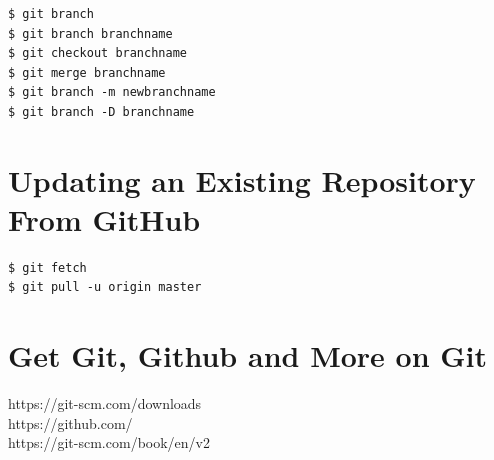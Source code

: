\begin{shaded}
\begin{verbatim}
$ git branch
$ git branch branchname
$ git checkout branchname
$ git merge branchname
$ git branch -m newbranchname
$ git branch -D branchname
\end{verbatim}
\end{shaded}

\vspace{1cm}

\section{Updating an Existing Repository From GitHub }

\begin{shaded}
\begin{verbatim}
$ git fetch
$ git pull -u origin master
\end{verbatim}
\end{shaded}

\vspace{1cm}

\section{Get Git, Github and More on Git}

https://git-scm.com/downloads  \\
\noindent https://github.com/  \\
\noindent  https://git-scm.com/book/en/v2








